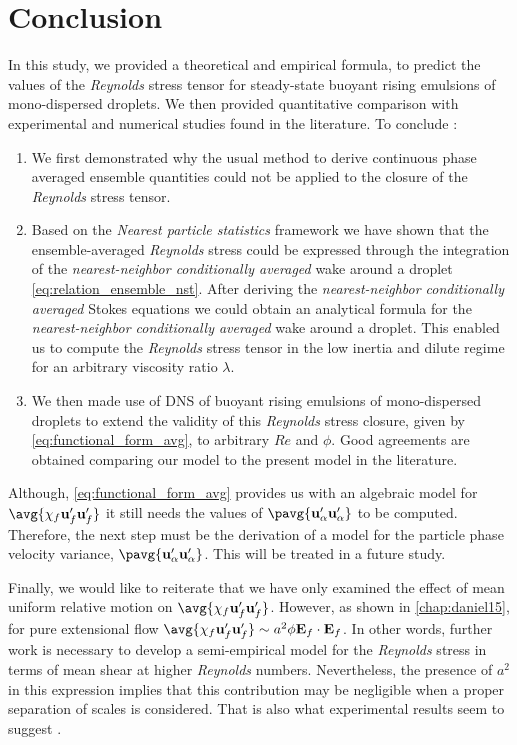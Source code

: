 \section{Conclusion}

In this study, we provided a theoretical and empirical formula, to predict the values of the \textit{Reynolds} stress tensor for steady-state buoyant rising emulsions of mono-dispersed droplets. 
We then provided quantitative comparison with experimental and numerical studies found in the literature. 
To conclude : 
\begin{enumerate}
    \item We first demonstrated why the usual method to derive continuous phase averaged ensemble quantities could not be applied to the closure of the \textit{Reynolds} stress tensor. 
    \item Based on the \textit{Nearest particle statistics} framework we have shown that the ensemble-averaged \textit{Reynolds} stress could be expressed through the integration of the \textit{nearest-neighbor conditionally averaged} wake around a droplet \eqref{eq:relation_ensemble_nst}. 
    After deriving the \textit{nearest-neighbor conditionally averaged} Stokes equations we could obtain an analytical formula for the \textit{nearest-neighbor conditionally averaged} wake around a droplet.
    This enabled us to compute the \textit{Reynolds} stress tensor in the low inertia and dilute regime for an arbitrary viscosity ratio $\lambda$. 
    \item  We then made use of DNS of buoyant rising emulsions of mono-dispersed droplets to extend the validity of this \textit{Reynolds} stress closure, given by \ref{eq:functional_form_avg}, to arbitrary $Re$ and $\phi$. 
    Good agreements are obtained comparing our model to the present model in the literature.  
\end{enumerate}
Although, \ref{eq:functional_form_avg} provides us with an algebraic model for $\avg{\chi_f \textbf{u}_f'\textbf{u}_f'}$ it still needs the values of $\pavg{\textbf{u}_\alpha' \textbf{u}_\alpha'}$ to be computed. 
Therefore, the next step must be the derivation of a model for the particle phase velocity variance, $\pavg{\textbf{u}_\alpha' \textbf{u}_\alpha'}$. 
This will be treated in a future study. 

Finally, we would like to reiterate that we have only examined the effect of mean uniform relative motion on $\avg{\chi_f \textbf{u}_f'\textbf{u}_f'}$. However, as shown in \ref{chap:daniel15}, for pure extensional flow $\avg{\chi_f \textbf{u}_f'\textbf{u}_f'} \sim a^2\phi \textbf{E}_f \cdot \textbf{E}_f$.
In other words, further work is necessary to develop a semi-empirical model for the \textit{Reynolds} stress in terms of mean shear at higher \textit{Reynolds} numbers.
Nevertheless, the presence of $a^2$ in this expression implies that this contribution may be negligible when a proper separation of scales is considered.
That is also what experimental results seem to suggest \citet{guazzelli2011}. 